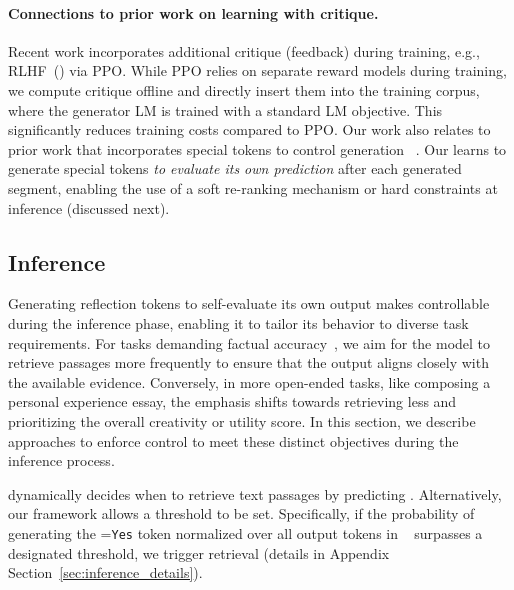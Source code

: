 \paragraph{Connections to prior work on learning with critique.}
Recent work 
incorporates additional critique (feedback) during training, e.g.,  RLHF~(\citealt{ouyang2022training}) via PPO. 
While PPO relies on separate reward models during training, we compute critique offline and directly insert them into the training corpus, where the generator LM is trained with a standard LM objective. This significantly reduces training costs compared to PPO. 
Our work also relates to prior work that incorporates special tokens to control generation ~\citep{keskar2019ctrl,lu2022quark, korbak2023pretraining}. Our \model learns to generate special tokens {\it to evaluate its own prediction} after each generated segment,  
enabling the use of a soft re-ranking mechanism or hard constraints at inference (discussed next). 

\subsection{\model Inference}
\label{sec:fine_grained_decoding}
Generating reflection tokens to self-evaluate its own output makes \model controllable during the inference phase, enabling it to tailor its behavior to diverse task requirements. 
For tasks demanding factual accuracy~\citep{min2023factscore}, we aim for the model to retrieve passages more frequently to ensure that the output aligns closely with the available evidence. Conversely, in more open-ended tasks, like composing a personal experience essay, the emphasis shifts towards retrieving less and prioritizing the overall creativity or utility score. In this section, we describe approaches to enforce control to meet these distinct objectives during the inference process.

\model dynamically decides when to retrieve text passages by predicting \ret. 
Alternatively, our framework allows a threshold to be set. Specifically, if the probability of generating the {\ret=\texttt{Yes}} token normalized over all output tokens in \ret~ surpasses a designated threshold, we trigger retrieval (details in Appendix Section~\ref{sec:inference_details}).   


